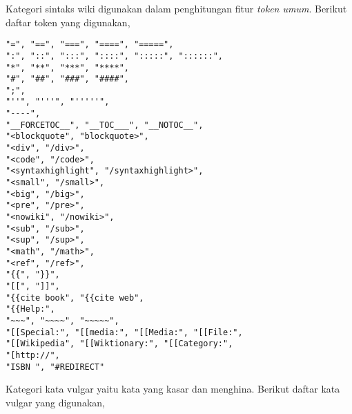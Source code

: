 	\label{lampiran:daftar_token_dan_kata}

\label{lampiran:words_wiki_token}

Kategori sintaks wiki digunakan dalam penghitungan fitur \textit{token umum}.
Berikut daftar token yang digunakan,

\begin{lstlisting}
"=", "==", "===", "====", "=====",
":", "::", ":::", "::::", ":::::", "::::::",
"*", "**", "***", "****",
"#", "##", "###", "####",
";",
"''", "'''", "'''''",
"----",
"__FORCETOC__", "__TOC___", "__NOTOC__",
"<blockquote", "blockquote>",
"<div", "/div>",
"<code", "/code>",
"<syntaxhighlight", "/syntaxhighlight>",
"<small", "/small>",
"<big", "/big>",
"<pre", "/pre>",
"<nowiki", "/nowiki>",
"<sub", "/sub>",
"<sup", "/sup>",
"<math", "/math>",
"<ref", "/ref>",
"{{", "}}",
"[[", "]]",
"{{cite book", "{{cite web",
"{{Help:",
"~~~", "~~~~", "~~~~~",
"[[Special:", "[[media:", "[[Media:", "[[File:",
"[[Wikipedia", "[[Wiktionary:", "[[Category:",
"[http://",
"ISBN ", "#REDIRECT"
\end{lstlisting}

\label{lampiran:words_vulgar}

Kategori kata vulgar yaitu kata yang kasar dan menghina.
Berikut daftar kata vulgar yang digunakan,

